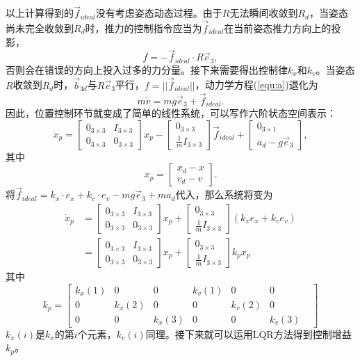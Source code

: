 以上计算得到的$\vec f_{ideal}$没有考虑姿态动态过程。由于$R$无法瞬间收敛到$R_d$，当姿态尚未完全收敛到$R_d$时，推力的控制指令应当为$\vec f_{ideal}$在当前姿态推力方向上的投影，
      $$f=-\vec f_{ideal}\cdot R \vec e_3,$$
否则会在错误的方向上投入过多的力分量。接下来需要得出控制律$k_x $和$ k_v$。当姿态$R$收敛到$R_d$时，$\vec b_{3d}$与$R \vec e_3$平行，$f=||\vec f_{ideal}||$，动力学方程(\ref{equ:a})退化为
      $$m \dot v=mg \vec e_3 + \vec f_{ideal}.$$
      因此，位置控制环节就变成了简单的线性系统，可以写作六阶状态空间表示：
      $$\dot x_p=\begin{bmatrix}
        0_{3\times 3} & I_{3\times 3} \\
        0_{3\times 3} & 0_{3\times 3}
    \end{bmatrix} x_p-\begin{bmatrix}
        0_{3\times 3} \\ \frac{1}{m} I_{3\times 3}
    \end{bmatrix} \vec f_{ideal} +\begin{bmatrix}
        0_{3 \times 1} \\ a_d-g \vec e_3 
    \end{bmatrix},$$
    其中
    $$x_p=\begin{bmatrix}
        x_d -x \\ v_d -v
    \end{bmatrix}.$$
将$\vec f_{ideal}=k_x \cdot e_x+k_v \cdot e_v-mg \vec e_3+m a_d$代入，那么系统将变为
$$
\begin{aligned}
  \dot x_p&=\begin{bmatrix}
    0_{3\times 3} & I_{3\times 3} \\
    0_{3\times 3} & 0_{3\times 3}
  \end{bmatrix} x_p+\begin{bmatrix}
    0_{3\times 3} \\ \frac{1}{m} I_{3\times 3}
  \end{bmatrix}(k_x e_x+k_v e_v)\\
  &=\begin{bmatrix}
    0_{3\times 3} & I_{3\times 3} \\
    0_{3\times 3} & 0_{3\times 3}
  \end{bmatrix} x_p+\begin{bmatrix}
    0_{3\times 3} \\ \frac{1}{m} I_{3\times 3}
  \end{bmatrix} k_p x_p
\end{aligned}$$
其中
$$k_p=\begin{bmatrix}
  k_x(1) &0&0&k_v(1)&0&0\\
  0&k_x(2)&0&0&k_v(2)&0&\\
  0&0&k_x(3)&0&0&k_v(3)&
\end{bmatrix}$$
$k_x(i)$是$k_x$的第$i$个元素，$k_v(i)$同理。接下来就可以运用LQR方法得到控制增益$k_p$。

